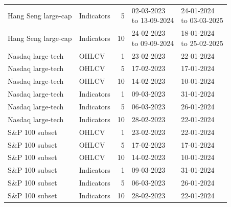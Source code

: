 \begin{longtable}{llrl l}
Hang Seng large-cap & Indicators & 5 & \shortstack[l]{02-03-2023\\to 13-09-2024} & \shortstack[l]{24-01-2024\\to 03-03-2025} \\
Hang Seng large-cap & Indicators & 10 & \shortstack[l]{24-02-2023\\to 09-09-2024} & \shortstack[l]{18-01-2024\\to 25-02-2025} \\
Nasdaq large-tech & OHLCV & 1 & 23-02-2023 & 22-01-2024 \\
Nasdaq large-tech & OHLCV & 5 & 17-02-2023 & 17-01-2024 \\
Nasdaq large-tech & OHLCV & 10 & 14-02-2023 & 10-01-2024 \\
Nasdaq large-tech & Indicators & 1 & 09-03-2023 & 31-01-2024 \\
Nasdaq large-tech & Indicators & 5 & 06-03-2023 & 26-01-2024 \\
Nasdaq large-tech & Indicators & 10 & 28-02-2023 & 22-01-2024 \\
S\&P 100 subset & OHLCV & 1 & 23-02-2023 & 22-01-2024 \\
S\&P 100 subset & OHLCV & 5 & 17-02-2023 & 17-01-2024 \\
S\&P 100 subset & OHLCV & 10 & 14-02-2023 & 10-01-2024 \\
S\&P 100 subset & Indicators & 1 & 09-03-2023 & 31-01-2024 \\
S\&P 100 subset & Indicators & 5 & 06-03-2023 & 26-01-2024 \\
S\&P 100 subset & Indicators & 10 & 28-02-2023 & 22-01-2024 \\
\end{longtable}
\endgroup
